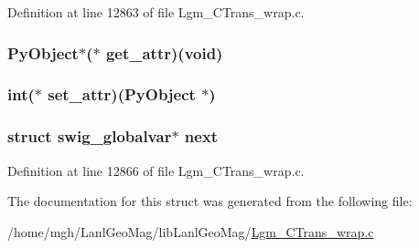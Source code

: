 Definition at line 12863 of file Lgm\_\-CTrans\_\-wrap.c.\hypertarget{structswig__globalvar_0879d4d584d1ffda2ef5f917dc5a6f0a}{
\subsubsection[{get\_\-attr}]{\setlength{\rightskip}{0pt plus 5cm}PyObject$\ast$($\ast$ {\bf get\_\-attr})(void)}}
\label{structswig__globalvar_0879d4d584d1ffda2ef5f917dc5a6f0a}


\hypertarget{structswig__globalvar_a452f906a54c91621799831e4280478f}{
\subsubsection[{set\_\-attr}]{\setlength{\rightskip}{0pt plus 5cm}int($\ast$ {\bf set\_\-attr})(PyObject $\ast$)}}
\label{structswig__globalvar_a452f906a54c91621799831e4280478f}


\hypertarget{structswig__globalvar_caa8d5ee0bdeaf2c6975b8751dc580fa}{
\subsubsection[{next}]{\setlength{\rightskip}{0pt plus 5cm}struct {\bf swig\_\-globalvar}$\ast$ {\bf next}}}
\label{structswig__globalvar_caa8d5ee0bdeaf2c6975b8751dc580fa}




Definition at line 12866 of file Lgm\_\-CTrans\_\-wrap.c.

The documentation for this struct was generated from the following file:\begin{CompactItemize}
\item 
/home/mgh/LanlGeoMag/libLanlGeoMag/\hyperlink{_lgm___c_trans__wrap_8c}{Lgm\_\-CTrans\_\-wrap.c}\end{CompactItemize}
